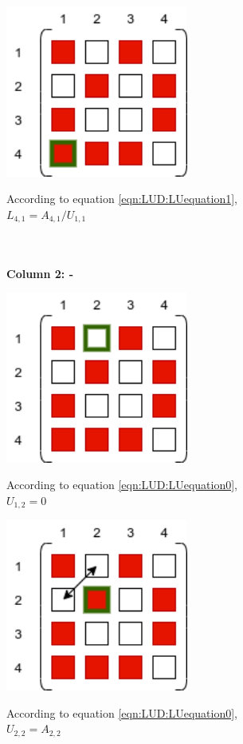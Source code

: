 \begin{minipage}{0.45\textwidth}
\includegraphics[width=0.45\textwidth]{./Scheduler/PpT-Symbolic_A03.png}
\end{minipage}%
\hfill
\begin{minipage}{0.85\textwidth}
According to equation \ref{eqn:LUD:LUequation1},\\
$L_{4,1}=A_{4,1}/U_{1,1}$
\end{minipage}
\\\\
\textbf{Column 2: -}

\begin{minipage}{0.45\textwidth}
\includegraphics[width=0.45\textwidth]{./Scheduler/PpT-Symbolic_A10.png}
\end{minipage}%
\hfill
\begin{minipage}{0.85\textwidth}
According to equation \ref{eqn:LUD:LUequation0},\\
$U_{1,2}=0$
\end{minipage}

\begin{minipage}{0.45\textwidth}
\includegraphics[width=0.45\textwidth]{./Scheduler/PpT-Symbolic_A11.png}
\end{minipage}%
\hfill
\begin{minipage}{0.85\textwidth}
According to equation \ref{eqn:LUD:LUequation0},\\
$U_{2,2}=A_{2,2}$
\end{minipage}

